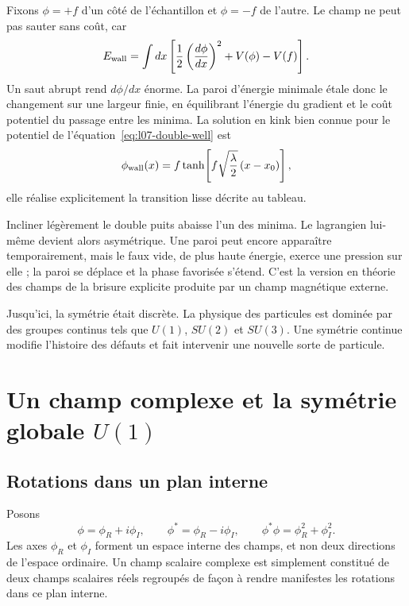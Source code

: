 Fixons \(\phi=+f\) d’un côté de l’échantillon et \(\phi=-f\) de l’autre. Le champ ne peut pas sauter sans coût, car
\begin{equation}
  E_{\rm wall}
  =\int dx\left[
      \frac12\left(\frac{d\phi}{dx}\right)^2+V(\phi)-V(f)
    \right].
  \label{eq:l07-wall-energy}
\end{equation}
Un saut abrupt rend \(d\phi/dx\) énorme. La paroi d’énergie minimale étale donc le changement sur une largeur finie, en équilibrant l’énergie du gradient et le coût potentiel du passage entre les minima. La solution en kink bien connue pour le potentiel de l’équation~\eqref{eq:l07-double-well} est
\begin{equation}
  \phi_{\rm wall}(x)
  =f\tanh\!\left[f\sqrt{\frac{\lambda}{2}}\,(x-x_0)\right],
  \label{eq:l07-kink}
\end{equation}
elle réalise explicitement la transition lisse décrite au tableau.

Incliner légèrement le double puits abaisse l’un des minima. Le lagrangien lui-même devient alors asymétrique. Une paroi peut encore apparaître temporairement, mais le faux vide, de plus haute énergie, exerce une pression sur elle ; la paroi se déplace et la phase favorisée s’étend. C’est la version en théorie des champs de la brisure explicite produite par un champ magnétique externe.

Jusqu’ici, la symétrie était discrète. La physique des particules est dominée par des groupes continus tels que \(U(1)\), \(SU(2)\) et \(SU(3)\). Une symétrie continue modifie l’histoire des défauts et fait intervenir une nouvelle sorte de particule.

\section{Un champ complexe et la symétrie globale \texorpdfstring{\(U(1)\)}{U(1)}}

\subsection{Rotations dans un plan interne}

Posons
\begin{equation}
  \phi=\phi_R+i\phi_I,
  \qquad
  \phi^*=\phi_R-i\phi_I,
  \qquad
  \phi^*\phi=\phi_R^2+\phi_I^2.
  \label{eq:l07-components}
\end{equation}
Les axes \(\phi_R\) et \(\phi_I\) forment un espace interne des champs, et non deux directions de l’espace ordinaire. Un champ scalaire complexe est simplement constitué de deux champs scalaires réels regroupés de façon à rendre manifestes les rotations dans ce plan interne.

